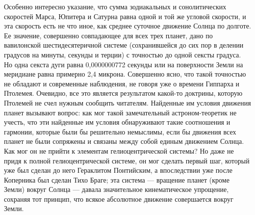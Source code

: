 Особенно интересно  указание, что сумма зодиакальных  и сонолитических
скоростей  Марса, Юпитера  и  Сатурна  равна одной  и  той же  угловой
скорости,  и эта  скорость  есть  не что  иное,  как среднее  суточное
движение Солнца  по долготе.  Ее значение, совершенно  совпадающее для
всех  трех  планет,  дано  по  вавилонской  шестидесятеричной  системе
(сохранившейся  до сих  пор в  делении градусов  на минуты,  секунды и
терции)  с точностью  до одной  сексты  градуса. Но  одна секста  дуги
равна  0,0000000772  секунды или  на  поверхности  Земли на  меридиане
равна примерно  2,4 микрона. Совершенно  ясно, что такой  точностью не
обладают и современные наблюдения, не  говоря уже о времени Гиппарха и
Птолемея. Очевидно,  все это  является результатом  какой-то доктрины,
которую  Птолемей  не счел  нужным  сообщить  читателям. Найденные  им
условия движения  планет вызывают вопрос: как  мог такой замечательный
астроном-теоретик не учесть, что эти найденные им условия обнаруживают
такие соотношения  и гармонии,  которые были бы  решительно немыслимы,
если  бы  движения всех  планет  не  были  сопряжены и  связаны  между
собой  единым движением  Солнца.  Как  мог он  не  прийти к  элементам
гелиоцентрической системы? Но даже не придя к полной гелиоцентрической
системе, он  мог сделать первый  шаг, который  уже был сделан  до него
Гераклитом Понтийским,  а впоследствии уже после  Коперника был сделан
Тихо  Браге; эта  система  --- вращение  планет  (кроме Земли)  вокруг
Солнца --- давала значительное  кинематическое упрощение, сохраняя тот
принцип, что всякое абсолютное движение совершается вокруг Земли.

